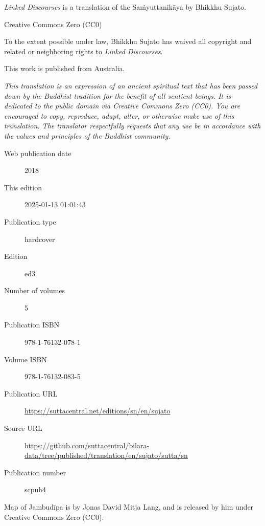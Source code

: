 \documentclass[12pt,openany]{book}%
\begin{document}
\begin{footnotesize}

\textit{Linked Discourses} is a translation of the Saṁyuttanikāya by Bhikkhu Sujato.

\medskip

Creative Commons Zero (CC0)

To the extent possible under law, Bhikkhu Sujato has waived all copyright and related or neighboring rights to \textit{Linked Discourses}.

\medskip

This work is published from Australia.

\begin{center}
\textit{This translation is an expression of an ancient spiritual text that has been passed down by the Buddhist tradition for the benefit of all sentient beings. It is dedicated to the public domain via Creative Commons Zero (CC0). You are encouraged to copy, reproduce, adapt, alter, or otherwise make use of this translation. The translator respectfully requests that any use be in accordance with the values and principles of the Buddhist community.}
\end{center}

\medskip

\begin{description}
    \item[Web publication date] 2018
    \item[This edition] 2025-01-13 01:01:43
    \item[Publication type] hardcover
    \item[Edition] ed3
    \item[Number of volumes] 5
    \item[Publication ISBN] 978-1-76132-078-1
    \item[Volume ISBN] 978-1-76132-083-5
    \item[Publication URL] \href{https://suttacentral.net/editions/sn/en/sujato}{https://suttacentral.net/editions/sn/en/sujato}
    \item[Source URL] \href{https://github.com/suttacentral/bilara-data/tree/published/translation/en/sujato/sutta/sn}{https://github.com/suttacentral/bilara-data/tree/published/translation/en/sujato/sutta/sn}
    \item[Publication number] scpub4
\end{description}

\medskip

Map of Jambudīpa is by Jonas David Mitja Lang, and is released by him under Creative Commons Zero (CC0).


\end{footnotesize}
\end{document}
